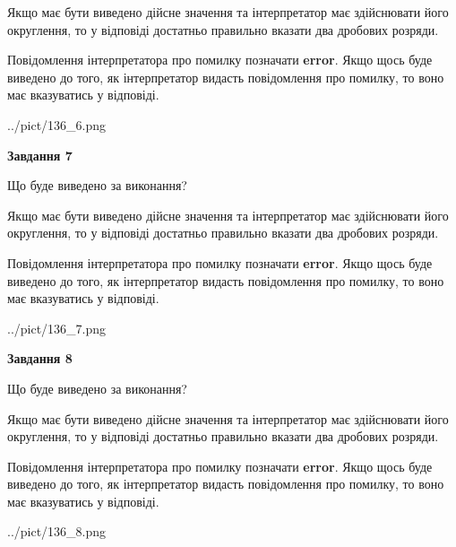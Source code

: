 \documentclass[12pt, ukrainian]{article}
\begin{document}
{\begin {Large}
Якщо має бути виведено дійсне значення та інтерпретатор має здійснювати його округлення, 
то у відповіді достатньо правильно вказати два дробових розряди.

Повідомлення інтерпретатора про помилку позначати \textbf{error}.
Якщо щось буде виведено до того, як інтерпретатор видасть повідомлення про помилку, 
то воно має вказуватись у відповіді. \par

\begin{center}
	{../pict/136_6.png}
\end{center}
\newpage

{\begin {center}\textbf{Завдання 7}\end {center}}\par
Що буде виведено за виконання? \par

Якщо має бути виведено дійсне значення та інтерпретатор має здійснювати його округлення, 
то у відповіді достатньо правильно вказати два дробових розряди.

Повідомлення інтерпретатора про помилку позначати \textbf{error}.
Якщо щось буде виведено до того, як інтерпретатор видасть повідомлення про помилку, 
то воно має вказуватись у відповіді. \par

\begin{center}
	{../pict/136_7.png}
\end{center}
\newpage

{\begin {center}\textbf{Завдання 8}\end {center}}\par
Що буде виведено за виконання? \par

Якщо має бути виведено дійсне значення та інтерпретатор має здійснювати його округлення, 
то у відповіді достатньо правильно вказати два дробових розряди.

Повідомлення інтерпретатора про помилку позначати \textbf{error}.
Якщо щось буде виведено до того, як інтерпретатор видасть повідомлення про помилку, 
то воно має вказуватись у відповіді. \par

\begin{center}
	{../pict/136_8.png}
\end{center}
\newpage


\end{Large}}
\end{document}
